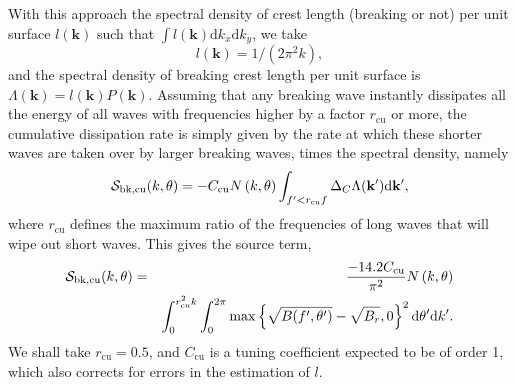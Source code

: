 With this approach the spectral density of crest length (breaking or not) per
unit surface $l(\mathbf{k})$ such that $\int l(\mathbf{k}) \mathrm{d}k_x
\mathrm{d}k_y$, we take
\begin{equation}
l(\mathbf{k})= 1/(2\pi^2 k),
\end{equation}
and the spectral density of breaking crest length per unit surface is
$\Lambda(\mathbf{k})=l(\mathbf{k})P(\mathbf{k})$.  Assuming that any breaking
wave instantly dissipates all the energy of all waves with frequencies higher
by a factor $r_{\mathrm{cu}}$ or more, the cumulative dissipation rate is
simply given by the rate at which these shorter waves are taken over by larger
breaking waves, times the spectral density, namely
\begin{equation}
{\cal S}_{\mathrm{bk,cu}}(k,\theta) = -C_{\mathrm{cu}}  N \left(k,\theta\right) \int_{f' < r_{\mathrm{cu}} f } \Delta_C \Lambda(\mathbf{k'}) \mathrm{d\mathbf{k'}},
\label{Sds_cu1}
\end{equation}
where $r_{\mathrm{cu}}$ defines the maximum ratio of the frequencies of long
waves that will wipe out short waves.  This gives the source term,
\begin{eqnarray}
{\cal S}_{\mathrm{bk,cu}}(k,\theta) &=&  \frac{-14.2 C_{\mathrm{cu}}}{\pi^2}  N \left(k,\theta\right)
 \nonumber \\
& &\int_0^{ r^2_{\mathrm{cu}} k }\int_0^{2\pi}
\max \left\{\sqrt{B(f',\theta')}-\sqrt{B_r},0\right\}^2
\mathrm{d}\theta' \mathrm{d}k'.
\label{Sds_sat_isotropic}
\end{eqnarray}
We shall take $r_{\mathrm{cu}}=0.5$, and $C_{\mathrm{cu}}$ is a tuning
coefficient expected to be of order 1, which also corrects for errors in the
estimation of $l$.

